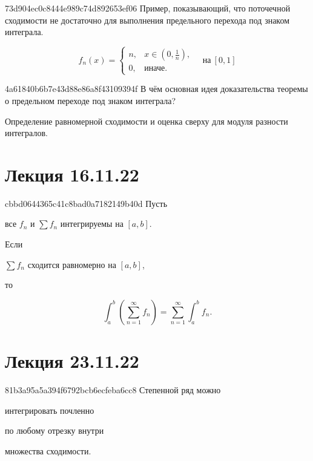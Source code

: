 \begin{note}{73d904ec0c8444e989c74d892653ef06}
    Пример, показывающий, что поточечной сходимости не достаточно для выполнения предельного перехода под знаком интеграла.

    \begin{cloze}{1}
        \[
            f_n(x) = \begin{cases}
                n, & x \in (0, \frac{1}{n}), \\
                0, & \text{иначе}.
            \end{cases}
            \quad \text{на}\ [0, 1]
        \]
    \end{cloze}
\end{note}

\begin{note}{4a61840b6b7e43d88e86a8f43109394f}
    В чём основная идея доказательства теоремы о предельном переходе под знаком интеграла?

    \begin{cloze}{1}
        Определение равномерной сходимости и оценка сверху для модуля разности интегралов.
    \end{cloze}
\end{note}

\section{Лекция 16.11.22}
\begin{note}{cbbd0644365c41c8bad0a7182149b40d}
    Пусть \begin{icloze}{3}все \({ f_n }\) и \({ \sum f_n }\) интегрируемы на \({ [a, b] }\).\end{icloze}
    Если \begin{icloze}{2}\({ \sum f_n }\) сходится равномерно на \({ [a, b] }\),\end{icloze} то
    \begin{icloze}{1}
        \[
            \int_{a}^{b} \left( \sum_{n=1}^{\infty} f_n \right) = \sum_{n=1}^{\infty} \int_{a}^{b} f_n.
        \]
    \end{icloze}
\end{note}

\section{Лекция 23.11.22}
\begin{note}{81b3a95a5a394f6792bcb6ecfeba6cc8}
    Степенной ряд можно \begin{icloze}{2}интегрировать почленно\end{icloze} по любому отрезку внутри \begin{icloze}{1}множества сходимости.\end{icloze}
\end{note}

